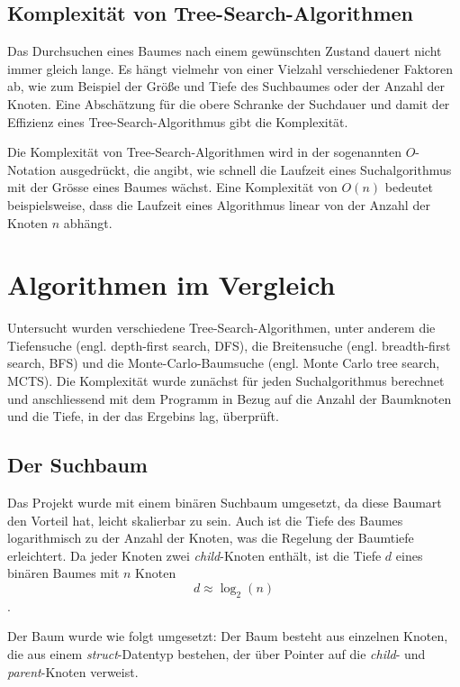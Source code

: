\documentclass[a4paper,11pt]{article}
\begin{document}
\subsection{Komplexität von Tree-Search-Algorithmen}
Das Durchsuchen eines Baumes nach einem gewünschten Zustand dauert nicht immer gleich lange. Es hängt vielmehr von einer Vielzahl verschiedener Faktoren ab, wie zum Beispiel der Größe und Tiefe des Suchbaumes oder der Anzahl der Knoten. Eine Abschätzung für die obere Schranke der Suchdauer und damit der Effizienz eines Tree-Search-Algorithmus gibt die Komplexität. 

Die Komplexität von Tree-Search-Algorithmen wird in der sogenannten $O$-Notation ausgedrückt, die angibt, wie schnell die Laufzeit eines Suchalgorithmus mit der Grösse eines Baumes wächst. Eine Komplexität von $O(n)$ bedeutet beispielsweise, dass die Laufzeit eines Algorithmus linear von der Anzahl der Knoten $n$ abhängt.

\section{Algorithmen im Vergleich}
Untersucht wurden verschiedene Tree-Search-Algorithmen, unter anderem die Tiefensuche (engl. depth-first search, DFS), die Breitensuche (engl. breadth-first search, BFS) und die Monte-Carlo-Baumsuche (engl. Monte Carlo tree search, MCTS). Die Komplexität wurde zunächst für jeden Suchalgorithmus berechnet und anschliessend mit dem Programm in Bezug auf die Anzahl der Baumknoten und die Tiefe, in der das Ergebins lag, überprüft.

\subsection{Der Suchbaum}
Das Projekt wurde mit einem binären Suchbaum umgesetzt, da diese Baumart den Vorteil hat, leicht skalierbar zu sein. Auch ist die Tiefe des Baumes logarithmisch zu der Anzahl der Knoten, was die Regelung der Baumtiefe erleichtert. Da jeder Knoten zwei \emph{child}-Knoten enthält, ist die Tiefe $d$ eines binären Baumes mit $n$ Knoten $$d \approx \log_2(n)$$ \cite{c2_algorithms}. %

Der Baum wurde wie folgt umgesetzt: Der Baum besteht aus einzelnen Knoten, die aus einem \emph{struct}-Datentyp bestehen, der über Pointer auf die \emph{child}- und \emph{parent}-Knoten verweist.
\end{document}
